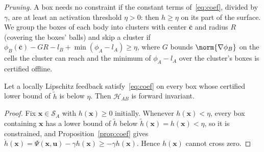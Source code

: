 \emph{Pruning.} A box needs no constraint if the constant terms of~\eqref{eq:coef}, divided by
$\gamma$, are at least an activation threshold $\eta>0$: then $h\ge\eta$ on its part of the surface.
We group the boxes of each body into clusters with center $\bar{\mathbf c}$ and radius $R$ (covering
the boxes' balls) and skip a cluster if $\phi_B(\bar{\mathbf c})-GR-l_B+\min(\phi_A-l_A)\ge\eta$,
where $G$ bounds $\norm{\nabla\phi_B}$ on the cells the cluster can reach and the minimum of
$\phi_A-l_A$ over the cluster's boxes is certified offline.
\begin{theorem}\label{thm:invariance}
Let a locally Lipschitz feedback satisfy~\eqref{eq:coef} on every box whose certified lower bound of
$\tilde h$ is below $\eta$. Then $\mathcal H_{AB}$ is forward invariant.
\end{theorem}
\begin{proof}
Fix $\mathbf x\in\mathcal S_A$ with $h(\mathbf x)\ge0$ initially. Whenever $h(\mathbf x)<\eta$, every
box containing $\mathbf x$ has a lower bound of $\tilde h$ below $\tilde h(\mathbf x)=h(\mathbf x)<\eta$,
so it is constrained, and Proposition~\ref{prop:coef} gives
$\dot h(\mathbf x)=\Psi(\mathbf x,\mathbf u)-\gamma h(\mathbf x)\ge-\gamma h(\mathbf x)$. Hence
$h(\mathbf x)$ cannot cross zero.
\end{proof}


